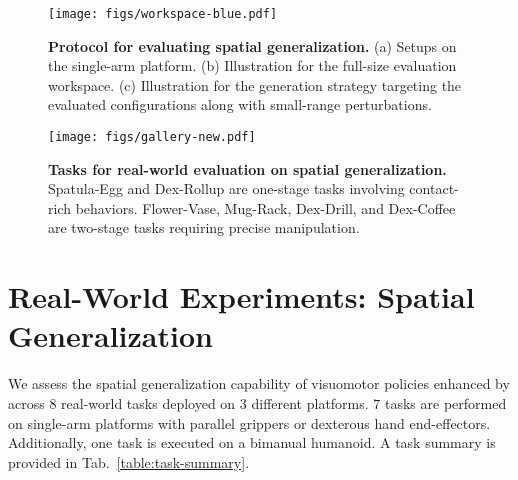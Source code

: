 \begin{figure*}
    \centering
    \texttt{[image: figs/workspace-blue.pdf]}
    \caption{\textbf{Protocol for evaluating spatial generalization.} (a) Setups on the single-arm platform. (b) Illustration for the full-size evaluation workspace. (c) Illustration for the generation strategy targeting the evaluated configurations along with small-range perturbations.}
    \label{fig:real-spatial-setup}
\end{figure*}


\begin{figure*}
    \centering
    \texttt{[image: figs/gallery-new.pdf]}
    \caption{\textbf{Tasks for real-world evaluation on spatial generalization.} Spatula-Egg and Dex-Rollup are one-stage tasks involving contact-rich behaviors. Flower-Vase, Mug-Rack, Dex-Drill, and Dex-Coffee are two-stage tasks requiring precise manipulation.}
    \label{fig:real-spatial-tasks}
\end{figure*}







\section{Real-World Experiments: Spatial Generalization}
We assess the spatial generalization capability of visuomotor policies enhanced by \method across $8$ real-world tasks deployed on $3$ different platforms. $7$ tasks are performed on single-arm platforms with parallel grippers or dexterous hand end-effectors. Additionally, one task is executed on a bimanual humanoid. A task summary is provided in Tab.~\ref{table:task-summary}.




